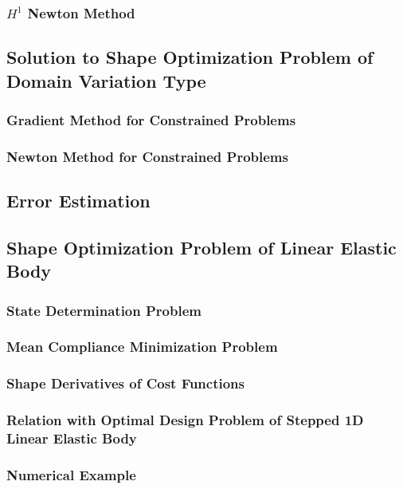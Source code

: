 \documentclass[oneside]{book}
\numberwithin{equation}{section}
\begin{document}
\subsubsection{$H^1$ Newton Method}

\subsection{Solution to Shape Optimization Problem of Domain Variation Type}

\subsubsection{Gradient Method for Constrained Problems}

\subsubsection{Newton Method for Constrained Problems}

\subsection{Error Estimation}

\subsection{Shape Optimization Problem of Linear Elastic Body}

\subsubsection{State Determination Problem}

\subsubsection{Mean Compliance Minimization Problem}

\subsubsection{Shape Derivatives of Cost Functions}

\subsubsection{Relation with Optimal Design Problem of Stepped 1D Linear Elastic Body}

\subsubsection{Numerical Example}
\end{document}
